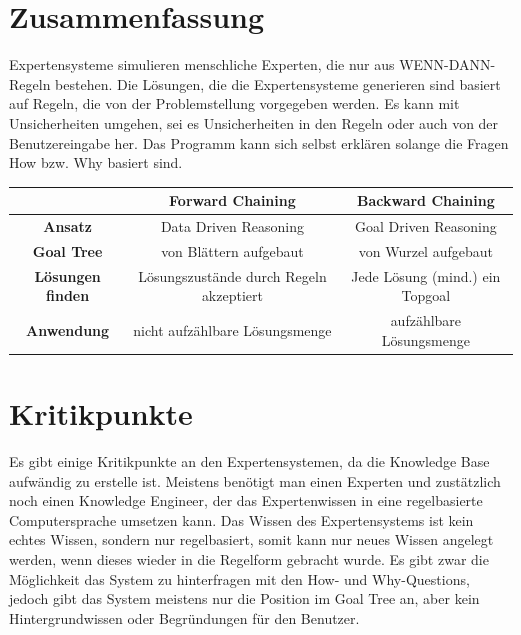 \section{Zusammenfassung}
Expertensysteme simulieren menschliche Experten, die nur aus WENN-DANN-Regeln bestehen. Die Lösungen, die die Expertensysteme generieren sind basiert auf Regeln, die von der Problemstellung vorgegeben werden. Es kann mit Unsicherheiten umgehen, sei es Unsicherheiten in den Regeln oder auch von der Benutzereingabe her. Das Programm kann sich selbst erklären solange die Fragen How bzw. Why basiert sind.

\begin{table}[H]
    \centering
    \label{zsmfassung_Chaining}
    \begin{tabular}{c|c|c}
                                    &\textbf{Forward Chaining}                  &\textbf{Backward Chaining}         \\\hline
        \textbf{Ansatz}             & Data Driven Reasoning                     & Goal Driven Reasoning             \\\hline
        \textbf{Goal Tree}          & von Blättern aufgebaut                    & von Wurzel aufgebaut              \\\hline
        \textbf{Lösungen finden}    & Lösungszustände durch Regeln akzeptiert   & Jede Lösung (mind.) ein Topgoal   \\\hline
        \textbf{Anwendung}          & nicht aufzählbare Lösungsmenge            & aufzählbare Lösungsmenge          \\
    \end{tabular}
\end{table}



\section{Kritikpunkte}
Es gibt einige Kritikpunkte an den Expertensystemen, da die Knowledge Base aufwändig zu erstelle ist. Meistens benötigt man einen Experten und zustätzlich noch einen Knowledge Engineer, der das Expertenwissen in eine regelbasierte Computersprache umsetzen kann. Das Wissen des Expertensystems ist kein echtes Wissen, sondern nur regelbasiert, somit kann nur neues Wissen angelegt werden, wenn dieses wieder in die Regelform gebracht wurde. Es gibt zwar die Möglichkeit das System zu hinterfragen mit den How- und Why-Questions, jedoch gibt das System meistens nur die Position im Goal Tree an, aber kein Hintergrundwissen oder Begründungen für den Benutzer.